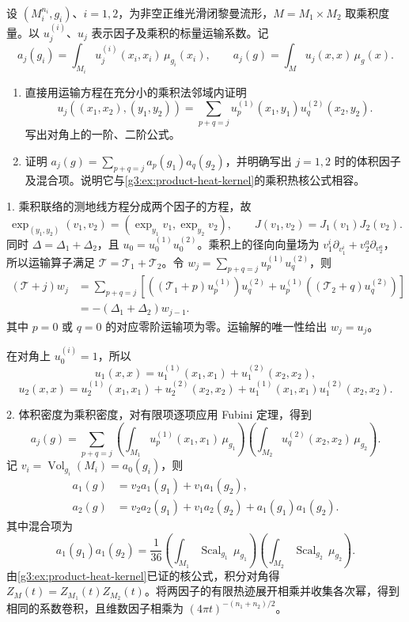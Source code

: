 \begin{exercise}\label{g3:ex:product-heat-transport}
	设 \((M_i^{n_i},g_i)\)、\(i=1,2\)，为非空正维光滑闭黎曼流形，\(M=M_1\times M_2\) 取乘积度量。以 \(u_j^{(i)}\)、\(u_j\) 表示因子及乘积的标量运输系数。记
	\[
		a_j(g_i)=\int_{M_i}u_j^{(i)}(x_i,x_i)\,\mu_{g_i}(x_i),
		\qquad a_j(g)=\int_Mu_j(x,x)\,\mu_g(x).
	\]
	\begin{enumerate}
		\item 直接用运输方程在充分小的乘积法邻域内证明
		\[
			u_j((x_1,x_2),(y_1,y_2))
			=\sum_{p+q=j}u_p^{(1)}(x_1,y_1)u_q^{(2)}(x_2,y_2).
		\]
		写出对角上的一阶、二阶公式。
		\item 证明 \(a_j(g)=\sum_{p+q=j}a_p(g_1)a_q(g_2)\)，并明确写出 \(j=1,2\) 时的体积因子及混合项。说明它与\cref{g3:ex:product-heat-kernel}的乘积热核公式相容。
	\end{enumerate}
\end{exercise}
\begin{solution}
	1. 乘积联络的测地线方程分成两个因子的方程，故
	\[
		\exp_{(y_1,y_2)}(v_1,v_2)
		=(\exp_{y_1}v_1,\exp_{y_2}v_2),\qquad
		J(v_1,v_2)=J_1(v_1)J_2(v_2).
	\]
	同时 \(\Delta=\Delta_1+\Delta_2\)，且 \(u_0=u_0^{(1)}u_0^{(2)}\)。乘积上的径向向量场为
	\(v_1^i\partial_{v_1^i}+v_2^a\partial_{v_2^a}\)，所以运输算子满足 \(\mathcal T=\mathcal T_1+\mathcal T_2\)。令
	\(w_j=\sum_{p+q=j}u_p^{(1)}u_q^{(2)}\)，则
	\[
		\begin{aligned}
			(\mathcal T+j)w_j
			&=\sum_{p+q=j}\left[
			((\mathcal T_1+p)u_p^{(1)})u_q^{(2)}
			+u_p^{(1)}((\mathcal T_2+q)u_q^{(2)})\right]\\
			&=-(\Delta_1+\Delta_2)w_{j-1}.
		\end{aligned}
	\]
	其中 \(p=0\) 或 \(q=0\) 的对应零阶运输项为零。运输解的唯一性给出 \(w_j=u_j\)。

	在对角上 \(u_0^{(i)}=1\)，所以
	\[
		u_1(x,x)=u_1^{(1)}(x_1,x_1)+u_1^{(2)}(x_2,x_2),
	\]
	\[
		u_2(x,x)=u_2^{(1)}(x_1,x_1)+u_2^{(2)}(x_2,x_2)
		+u_1^{(1)}(x_1,x_1)u_1^{(2)}(x_2,x_2).
	\]

	2. 体积密度为乘积密度，对有限项逐项应用 Fubini 定理，得到
	\[
		a_j(g)=\sum_{p+q=j}
		\left(\int_{M_1}u_p^{(1)}(x_1,x_1)\,\mu_{g_1}\right)
		\left(\int_{M_2}u_q^{(2)}(x_2,x_2)\,\mu_{g_2}\right).
	\]
	记 \(v_i=\operatorname{Vol}_{g_i}(M_i)=a_0(g_i)\)，则
	\[
		\begin{aligned}
			a_1(g)&=v_2a_1(g_1)+v_1a_1(g_2),\\
			a_2(g)&=v_2a_2(g_1)+v_1a_2(g_2)+a_1(g_1)a_1(g_2).
		\end{aligned}
	\]
	其中混合项为
	\[
		a_1(g_1)a_1(g_2)=\frac1{36}
		\left(\int_{M_1}\operatorname{Scal}_{g_1}\,\mu_{g_1}\right)
		\left(\int_{M_2}\operatorname{Scal}_{g_2}\,\mu_{g_2}\right).
	\]
	由\cref{g3:ex:product-heat-kernel}已证的核公式，积分对角得 \(Z_M(t)=Z_{M_1}(t)Z_{M_2}(t)\)。将两因子的有限热迹展开相乘并收集各次幂，得到相同的系数卷积，且维数因子相乘为 \((4\pi t)^{-(n_1+n_2)/2}\)。
\end{solution}

